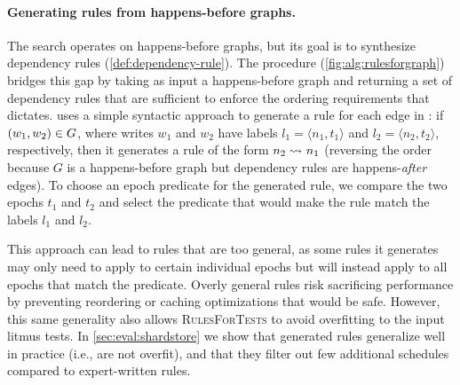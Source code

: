 \paragraph{Generating rules from happens-before graphs.}
The  search operates on happens-before graphs,
but its goal is to synthesize dependency rules (\cref{def:dependency-rule}).
The  procedure (\cref{fig:alg:rulesforgraph})
bridges this gap
by taking as input a happens-before graph \gr
and returning a set of dependency rules 
that are sufficient to enforce the ordering requirements that \gr dictates.
 uses a simple syntactic approach to generate a rule for each edge in \gr:
if $(w_1, w_2) \in G$,
where writes $w_1$ and $w_2$ have labels $l_1 = \langle n_1, t_1 \rangle$ and $l_2 = \langle n_2, t_2 \rangle$, respectively,
then it generates a rule of the form $n_2\rightsquigarrow_{}n_1$
(reversing the order because $G$ is a happens-before graph
but dependency rules are happens-\emph{after} edges).
To choose an epoch predicate for the generated rule,
we compare the two epochs $t_1$ and $t_2$
and select the predicate that would make the rule match the labels $l_1$ and $l_2$.\tighten

This approach can lead to rules that are too general,
as some rules it generates may only need to apply to certain individual epochs
but will instead apply to all epochs that match the predicate.
Overly general rules risk sacrificing performance
by preventing reordering or caching optimizations that would be safe.
However, this same generality also allows \textsc{RulesForTests} to avoid overfitting to the input litmus tests.
In \cref{sec:eval:shardstore} we show that generated rules generalize well in practice (i.e., are not overfit),
and that they filter out few additional schedules compared to expert-written rules.

